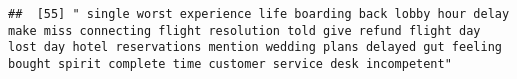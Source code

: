 \documentclass[
]{article}
\begin{document}
\begin{verbatim}
##  [55] " single worst experience life boarding back lobby hour delay make miss connecting flight resolution told give refund flight day lost day hotel reservations mention wedding plans delayed gut feeling bought spirit complete time customer service desk incompetent"                                                                                                                                                                                                                                                                                                                                                                                                                                                                                                                                                                                                                                                                                                                                                                                                                                                                                                                                                                                                                                                                                                                                                                                                                                                                                                                                                                                                                                                                                                                           

\end{verbatim}
\end{document}
